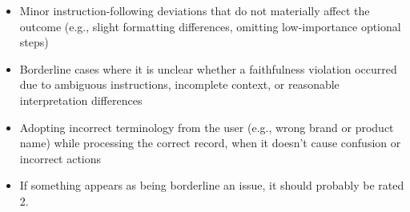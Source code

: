 \begin{tcolorbox}[promptbox, title={\small Faithfulness Prompt}]
\begin{itemize}
\begin{itemize}
\begin{itemize}
          \end{itemize}
          \item Minor instruction-following deviations that do not materially affect the outcome (e.g., slight formatting differences, omitting low-importance optional steps)
          \item Borderline cases where it is unclear whether a faithfulness violation occurred due to ambiguous instructions, incomplete context, or reasonable interpretation differences
          \item Adopting incorrect terminology from the user (e.g., wrong brand or product name) while processing the correct record, when it doesn't cause confusion or incorrect actions
          \item If something appears as being borderline an issue, it should probably be rated 2.
        \end{itemize}


\end{itemize}
\end{tcolorbox}
